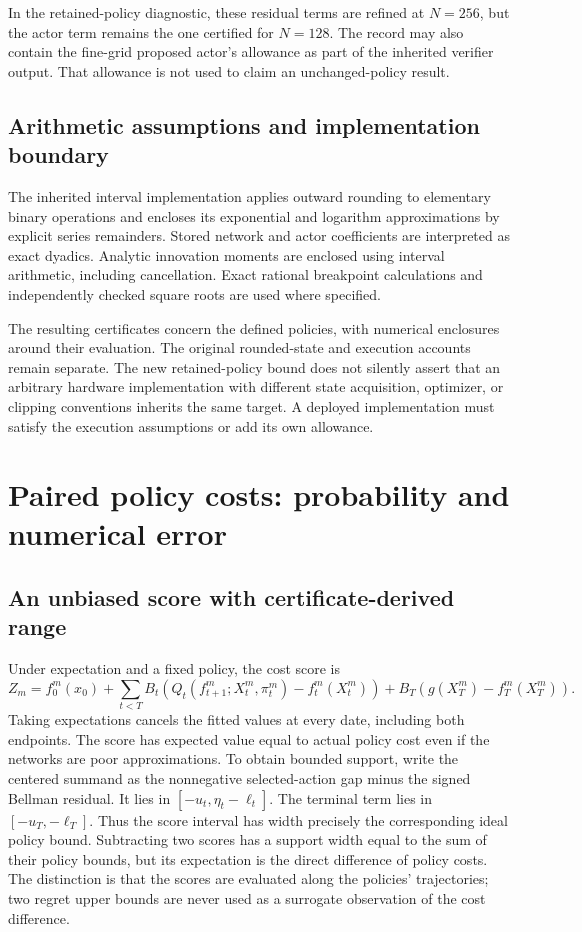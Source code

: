 \documentclass[ecta,nameyear,draft]{econsocart}
\begin{document}
In the retained-policy diagnostic, these residual terms are refined at $N=256$, but the actor term remains the one certified for $N=128$. The record may also contain the fine-grid proposed actor's allowance as part of the inherited verifier output. That allowance is not used to claim an unchanged-policy result.

\subsection{Arithmetic assumptions and implementation boundary}
The inherited interval implementation applies outward rounding to elementary binary operations and encloses its exponential and logarithm approximations by explicit series remainders. Stored network and actor coefficients are interpreted as exact dyadics. Analytic innovation moments are enclosed using interval arithmetic, including cancellation. Exact rational breakpoint calculations and independently checked square roots are used where specified.

The resulting certificates concern the defined policies, with numerical enclosures around their evaluation. The original rounded-state and execution accounts remain separate. The new retained-policy bound does not silently assert that an arbitrary hardware implementation with different state acquisition, optimizer, or clipping conventions inherits the same target. A deployed implementation must satisfy the execution assumptions or add its own allowance.

\section{Paired policy costs: probability and numerical error}
\subsection{An unbiased score with certificate-derived range}
Under expectation and a fixed policy, the cost score is
\[
 Z_m=f_0^m(x_0)+\sum_{t<T}B_t(Q_t(f_{t+1}^m;X_t^m,\pi_t^m)-f_t^m(X_t^m))
            +B_T(g(X_T^m)-f_T^m(X_T^m)).
\]
Taking expectations cancels the fitted values at every date, including both endpoints. The score has expected value equal to actual policy cost even if the networks are poor approximations. To obtain bounded support, write the centered summand as the nonnegative selected-action gap minus the signed Bellman residual. It lies in $[-u_t,\eta_t-\ell_t]$. The terminal term lies in $[-u_T,-\ell_T]$. Thus the score interval has width precisely the corresponding ideal policy bound. Subtracting two scores has a support width equal to the sum of their policy bounds, but its expectation is the direct difference of policy costs. The distinction is that the scores are evaluated along the policies' trajectories; two regret upper bounds are never used as a surrogate observation of the cost difference.
\end{document}

